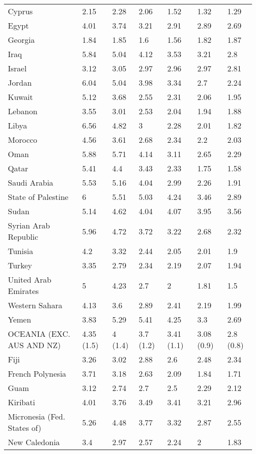 \begin{longtable}[t]{lllllll}
Cyprus & 2.15 & 2.28 & 2.06 & 1.52 & 1.32 & 1.29\\
Egypt & 4.01 & 3.74 & 3.21 & 2.91 & 2.89 & 2.69\\
Georgia & 1.84 & 1.85 & 1.6 & 1.56 & 1.82 & 1.87\\
Iraq & 5.84 & 5.04 & 4.12 & 3.53 & 3.21 & 2.8\\
Israel & 3.12 & 3.05 & 2.97 & 2.96 & 2.97 & 2.81\\
Jordan & 6.04 & 5.04 & 3.98 & 3.34 & 2.7 & 2.24\\
Kuwait & 5.12 & 3.68 & 2.55 & 2.31 & 2.06 & 1.95\\
Lebanon & 3.55 & 3.01 & 2.53 & 2.04 & 1.94 & 1.88\\
Libya & 6.56 & 4.82 & 3 & 2.28 & 2.01 & 1.82\\
Morocco & 4.56 & 3.61 & 2.68 & 2.34 & 2.2 & 2.03\\
Oman & 5.88 & 5.71 & 4.14 & 3.11 & 2.65 & 2.29\\
Qatar & 5.41 & 4.4 & 3.43 & 2.33 & 1.75 & 1.58\\
Saudi Arabia & 5.53 & 5.16 & 4.04 & 2.99 & 2.26 & 1.91\\
State of Palestine & 6 & 5.51 & 5.03 & 4.24 & 3.46 & 2.89\\
Sudan & 5.14 & 4.62 & 4.04 & 4.07 & 3.95 & 3.56\\
Syrian Arab Republic & 5.96 & 4.72 & 3.72 & 3.22 & 2.68 & 2.32\\
Tunisia & 4.2 & 3.32 & 2.44 & 2.05 & 2.01 & 1.9\\
Turkey & 3.35 & 2.79 & 2.34 & 2.19 & 2.07 & 1.94\\
United Arab Emirates & 5 & 4.23 & 2.7 & 2 & 1.81 & 1.5\\
Western Sahara & 4.13 & 3.6 & 2.89 & 2.41 & 2.19 & 1.99\\
Yemen & 3.83 & 5.29 & 5.41 & 4.25 & 3.3 & 2.69\\
OCEANIA (EXC. AUS AND NZ) & 4.35 (1.5) & 4 (1.4) & 3.7 (1.2) & 3.41 (1.1) & 3.08 (0.9) & 2.8 (0.8)\\
Fiji & 3.26 & 3.02 & 2.88 & 2.6 & 2.48 & 2.34\\
French Polynesia & 3.71 & 3.18 & 2.63 & 2.09 & 1.84 & 1.71\\
Guam & 3.12 & 2.74 & 2.7 & 2.5 & 2.29 & 2.12\\
Kiribati & 4.01 & 3.76 & 3.49 & 3.41 & 3.21 & 2.96\\
Micronesia (Fed. States of) & 5.26 & 4.48 & 3.77 & 3.32 & 2.87 & 2.55\\
New Caledonia & 3.4 & 2.97 & 2.57 & 2.24 & 2 & 1.83\\

\end{longtable}
